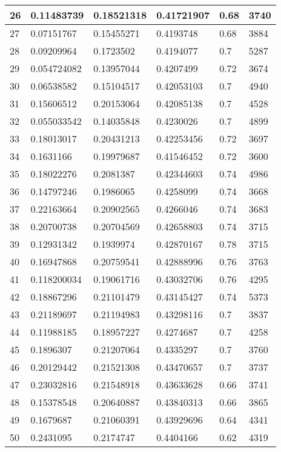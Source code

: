 \begin{longtable}{|l|l|l|l|l|l|}
26 & 0.11483739 & 0.18521318 & 0.41721907 & 0.68 & 3740 \\ \hline 
27 & 0.07151767 & 0.15455271 & 0.4193748 & 0.68 & 3884 \\ \hline 
28 & 0.09209964 & 0.1723502 & 0.4194077 & 0.7 & 5287 \\ \hline 
29 & 0.054724082 & 0.13957044 & 0.4207499 & 0.72 & 3674 \\ \hline 
30 & 0.06538582 & 0.15104517 & 0.42053103 & 0.7 & 4940 \\ \hline 
31 & 0.15606512 & 0.20153064 & 0.42085138 & 0.7 & 4528 \\ \hline 
32 & 0.055033542 & 0.14035848 & 0.4230026 & 0.7 & 4899 \\ \hline 
33 & 0.18013017 & 0.20431213 & 0.42253456 & 0.72 & 3697 \\ \hline 
34 & 0.1631166 & 0.19979687 & 0.41546452 & 0.72 & 3600 \\ \hline 
35 & 0.18022276 & 0.2081387 & 0.42344603 & 0.74 & 4986 \\ \hline 
36 & 0.14797246 & 0.1986065 & 0.4258099 & 0.74 & 3668 \\ \hline 
37 & 0.22163664 & 0.20902565 & 0.4266046 & 0.74 & 3683 \\ \hline 
38 & 0.20700738 & 0.20704569 & 0.42658803 & 0.74 & 3715 \\ \hline 
39 & 0.12931342 & 0.1939974 & 0.42870167 & 0.78 & 3715 \\ \hline 
40 & 0.16947868 & 0.20759541 & 0.42888996 & 0.76 & 3763 \\ \hline 
41 & 0.118200034 & 0.19061716 & 0.43032706 & 0.76 & 4295 \\ \hline 
42 & 0.18867296 & 0.21101479 & 0.43145427 & 0.74 & 5373 \\ \hline 
43 & 0.21189697 & 0.21194983 & 0.43298116 & 0.7 & 3837 \\ \hline 
44 & 0.11988185 & 0.18957227 & 0.4274687 & 0.7 & 4258 \\ \hline 
45 & 0.1896307 & 0.21207064 & 0.4335297 & 0.7 & 3760 \\ \hline 
46 & 0.20129442 & 0.21521308 & 0.43470657 & 0.7 & 3737 \\ \hline 
47 & 0.23032816 & 0.21548918 & 0.43633628 & 0.66 & 3741 \\ \hline 
48 & 0.15378548 & 0.20640887 & 0.43840313 & 0.66 & 3865 \\ \hline 
49 & 0.1679687 & 0.21060391 & 0.43929696 & 0.64 & 4341 \\ \hline 
50 & 0.2431095 & 0.2174747 & 0.4404166 & 0.62 & 4319 \\ \hline 
\end{longtable}